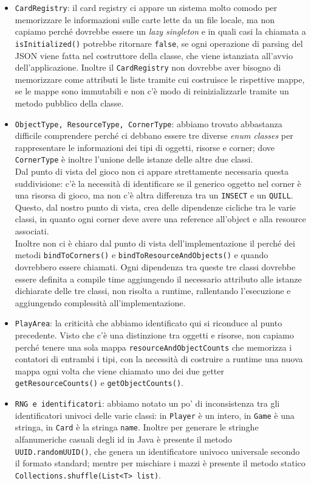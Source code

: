 \documentclass[12pt]{article}
\begin{document}
\begin{itemize}
    \item \texttt{CardRegistry}: il card registry ci appare un sistema molto comodo per memorizzare le informazioni sulle carte lette da un file locale, ma non capiamo perché dovrebbe essere un \textit{lazy singleton} e in quali casi la chiamata a \texttt{isInitialized()} potrebbe ritornare \texttt{false}, se ogni operazione di parsing del JSON viene fatta nel costruttore della classe, che viene istanziata all'avvio dell'applicazione. Inoltre il \texttt{CardRegistry} non dovrebbe aver bisogno di memorizzare come attributi le liste tramite cui costruisce le rispettive mappe, se le mappe sono immutabili e non c'è modo di reinizializzarle tramite un metodo pubblico della classe.
    \item \texttt{ObjectType, ResourceType, CornerType}: abbiamo trovato abbastanza difficile comprendere perché ci debbano essere tre diverse \textit{enum classes} per rappresentare le informazioni dei tipi di oggetti, risorse e corner; dove \texttt{CornerType} è inoltre l'unione delle istanze delle altre due classi.\\
    Dal punto di vista del gioco non ci appare strettamente necessaria questa suddivisione: c'è la necessità di identificare se il generico oggetto nel corner è una risorsa di gioco, ma non c'è altra differenza tra un \texttt{INSECT} e un \texttt{QUILL}.\\
    Questo, dal nostro punto di vista, crea delle dipendenze cicliche tra le varie classi, in quanto ogni corner deve avere una reference all'object e alla resource associati.\\
    Inoltre non ci è chiaro dal punto di vista dell'implementazione il perché dei metodi \texttt{bindToCorners()} e \texttt{bindToResourceAndObjects()} e quando dovrebbero essere chiamati. Ogni dipendenza tra queste tre classi dovrebbe essere definita a compile time aggiungendo il necessario attributo alle istanze dichiarate delle tre classi, non risolta a runtime, rallentando l'esecuzione e aggiungendo complessità all'implementazione.
    \item \texttt{PlayArea}: la criticità che abbiamo identificato qui si riconduce al punto precedente. Visto che c'è una distinzione tra oggetti e risorse, non capiamo perché tenere una sola mappa \texttt{resourceAndObjectCounts} che memorizza i contatori di entrambi i tipi, con la necessità di costruire a runtime una nuova mappa ogni volta che viene chiamato uno dei due getter \texttt{getResourceCounts()} e \texttt{getObjectCounts()}.
    \item \texttt{RNG e identificatori}: abbiamo notato un po' di inconsistenza tra gli identificatori univoci delle varie classi: in \texttt{Player} è un intero, in \texttt{Game} è una stringa, in \texttt{Card} è la stringa \texttt{name}. Inoltre per generare le stringhe alfanumeriche casuali degli id in Java è presente il metodo \texttt{UUID.randomUUID()}, che genera un identificatore univoco universale secondo il formato standard; mentre per mischiare i mazzi è presente il metodo statico \texttt{Collections.shuffle(List<T> list)}.
\end{itemize}
%
\end{document}
